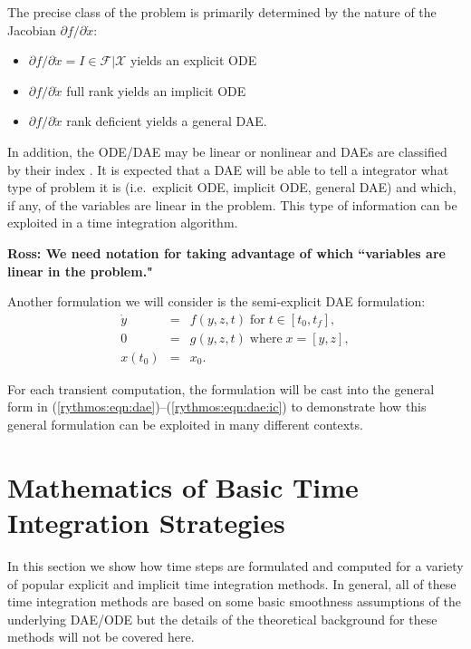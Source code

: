 \documentclass[pdf,ps2pdf,11pt]{SANDreport}
\begin{document}
The precise class of the problem is primarily determined by the nature of the
Jacobian ${}\partial f / {}\partial {}\dot{x}$:
%
\begin{itemize}
%
{}\item ${}\partial f / {}\partial {}\dot{x} = I {}\in {}\mathcal{F}|\mathcal{X}$ yields an explicit ODE
%
{}\item ${}\partial f / {}\partial {}\dot{x}$ full rank yields an implicit ODE
%
{}\item ${}\partial f / {}\partial {}\dot{x}$ rank deficient yields a general
DAE.
\end{itemize}
%
In addition, the ODE/DAE may be linear or nonlinear and DAEs are classified by
their index \cite{BCP}.  It is expected that a DAE will be able to tell a 
integrator what type of problem it is (i.e.\ explicit ODE, implicit ODE,
general DAE) and which, if any, of the variables are linear in the problem.
This type of information can be exploited in a time integration algorithm.

{}\textbf{Ross: We need notation for taking advantage of which ``variables are
linear in the problem."}

Another formulation we will consider is the semi-explicit DAE formulation:
\begin{equation}
\label{rythmos:eqn:dae:semiexplicit} 
\begin{array}{rcl}
\dot{y} & = & f(y,z,t) \; \mbox{for} \; t \in [t_0, t_f], \\
0       & = & g(y,z,t) \; \mbox{where} \; x = [y, z], \\
x(t_0)  & = & x_0.
\end{array}
\end{equation}

For each transient computation, the formulation will be cast into the general
form in (\ref{rythmos:eqn:dae})--(\ref{rythmos:eqn:dae:ic}) to demonstrate how
this general formulation can be exploited in many different contexts.

\section{Mathematics of Basic Time Integration Strategies}

In this section we show how time steps are formulated and computed for a
variety of popular explicit and implicit time integration methods.  In general,
all of these time integration methods are based on some basic smoothness
assumptions of the underlying DAE/ODE but the details of the theoretical
background for these methods will not be covered here.
\end{document}
